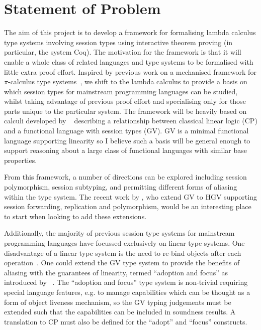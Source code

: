 \documentclass{mprop}
\newcommand{\1}{\textbf{1}\xspace}
\begin{document}
\section{Statement of Problem}

The aim of this project is to develop a framework for formalising lambda
calculus type systems involving session types using interactive theorem
proving (in particular, the system Coq). The motivation for the framework is
that it will enable a whole class of related languages and type systems to be
formalised with little extra proof effort. Inspired by previous work on a
mechanised framework for $\pi$-calculus type systems~\cite{Gay:2001:FFP}, we
shift to the lambda calculus to provide a basis on which session types for
mainstream programming languages can be studied, whilst taking advantage of
previous proof effort and specialising only for those parts unique to the
particular system. The framework will be heavily based on calculi developed by \citeauthor{Wadler:2012}~\cite{Wadler:2012} describing a relationship between classical linear logic (CP) and a functional language with session types (GV). GV is a minimal functional language supporting linearity so I believe such a basis will be general enough to support reasoning about a large class of functional languages with similar base properties.

From this framework, a number of directions can be explored including
session polymorphism, session subtyping, and permitting different forms of
aliasing within the type system. The recent work by \citeauthor{Lindley:2014:SAP} \cite{Lindley:2014:SAP}, who extend GV to HGV supporting session forwarding, replication and polymorphism, would be an interesting place to start when looking to add these extensions.

Additionally, the majority of previous session type systems for mainstream programming languages have focussed exclusively on linear type systems. One disadvantage of a linear type system is the need to re-bind objects after each operation~\cite{Gay:2010:LAST}. One could extend the GV type system to provide the benefits of aliasing with the guarantees of linearity, termed ``adoption and focus'' as introduced by~\citeauthor{Fahndrich:2002} \cite{Fahndrich:2002}. The ``adoption and focus'' type system is non-trivial requiring special language features, e.g. to manage capabilities which can be thought as a form of object liveness mechanism, so the GV typing judgements must be extended such that the capabilities can be included in soundness results. A translation to CP must also be defined for the ``adopt'' and ``focus'' constructs.
\end{document}
